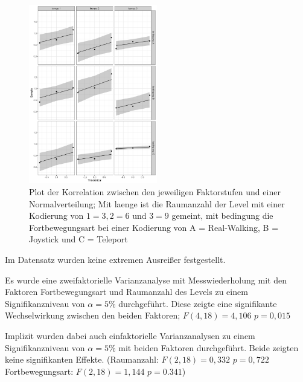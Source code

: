                     \begin{figure}[!h]
                        \centering
                        \includegraphics[width=0.5\textwidth]{plots/qqplot2way.png}
                        \caption{Plot der Korrelation zwischen den jeweiligen Faktorstufen und einer Normalverteilung; Mit laenge ist die Raumanzahl der Level mit einer Kodierung von $1 = 3, 2 = 6$ und $3 = 9$ gemeint, mit bedingung die Fortbewegungsart bei einer Kodierung von A = Real-Walking, B = Joystick und C = Teleport}\label{figure:qqplot-2way}
                    \end{figure}

                    Im Datensatz wurden keine extremen Ausreißer festgestellt.

                    Es wurde eine zweifaktorielle Varianzanalyse mit Messwiederholung mit den Faktoren Fortbewegungsart und Raumanzahl des Levels zu einem Signifikanzniveau von $\alpha = 5\%$ durchgeführt.
                    Diese zeigte eine signifikante Wechselwirkung zwischen den beiden Faktoren; $F(4,18) = 4,106$  $p = 0,015$

                    Implizit wurden dabei auch einfaktorielle Varianzanalysen zu einem Signifikanzniveau von $\alpha = 5\%$ mit beiden Faktoren durchgeführt. Beide zeigten keine signifikanten Effekte. (Raumanzahl: $F(2,18) = 0,332$  $ p = 0,722$   Fortbewegungsart: $F(2,18) = 1,144$  $ p = 0.341$)

%

